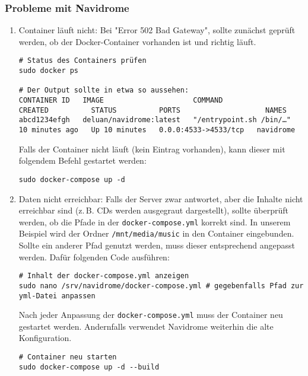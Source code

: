 \documentclass[12pt,a4paper]{report}
\begin{document}
    \subsubsection*{Probleme mit Navidrome}
    \begin{enumerate}
      \item Container läuft nicht:
      Bei "Error 502 Bad Gateway", sollte zunächst geprüft werden, ob der Docker-Container vorhanden ist und richtig läuft.

      \begin{verbatim}
# Status des Containers prüfen
sudo docker ps

# Der Output sollte in etwa so aussehen:
CONTAINER ID   IMAGE                     COMMAND                  CREATED          STATUS          PORTS                    NAMES
abcd1234efgh   deluan/navidrome:latest   "/entrypoint.sh /bin/…"   10 minutes ago   Up 10 minutes   0.0.0:4533->4533/tcp   navidrome
      \end{verbatim} 

      Falls der Container nicht läuft (kein Eintrag vorhanden), kann dieser mit folgendem Befehl gestartet werden:
      \begin{verbatim}
sudo docker-compose up -d
      \end{verbatim}

      \item Daten nicht erreichbar:
      Falls der Server zwar antwortet, aber die Inhalte nicht erreichbar sind (z.\,B. CDs werden ausgegraut dargestellt), 
      sollte überprüft werden, ob die Pfade in der \texttt{docker-compose.yml} korrekt sind.  
      In unserem Beispiel wird der Ordner \texttt{/mnt/media/music} in den Container eingebunden.  
      Sollte ein anderer Pfad genutzt werden, muss dieser entsprechend angepasst werden.
      Dafür folgenden Code ausführen:

      \begin{verbatim}
# Inhalt der docker-compose.yml anzeigen
sudo nano /srv/navidrome/docker-compose.yml # gegebenfalls Pfad zur yml-Datei anpassen
      \end{verbatim}

      Nach jeder Anpassung der \texttt{docker-compose.yml} muss der Container neu gestartet werden.  
      Andernfalls verwendet Navidrome weiterhin die alte Konfiguration.
      
      \begin{verbatim}
# Container neu starten
sudo docker-compose up -d --build
      \end{verbatim}


\end{enumerate}
\end{document}
